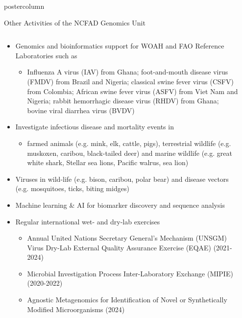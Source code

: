 \documentclass[final]{beamer}
\begin{document}
\begin{frame}
\begin{columns}
\begin{column}{.5\textwidth}
\begin{beamercolorbox}[center,wd=\textwidth]{postercolumn}
\begin{minipage}[T]{.95\textwidth}
{  %
  \begin{block}{Other Activities of the NCFAD Genomics Unit}
    \begin{columns}
      \begin{column}{0.7\textwidth}
        \begin{itemize}
          \item Genomics and bioinformatics support for WOAH and FAO Reference Laboratories such as
          \begin{itemize}
            \item Influenza A virus (IAV) from Ghana; foot-and-mouth disease virus (FMDV) from Brazil and Nigeria; classical swine fever virus (CSFV) from Colombia; African swine fever virus (ASFV) from Viet Nam and Nigeria; rabbit hemorrhagic disease virus (RHDV) from Ghana; bovine viral diarrhea virus (BVDV)
          \end{itemize}
          \item Investigate infectious disease and mortality events in
          \begin{itemize}
            \item farmed animals (e.g. mink, elk, cattle, pigs), terrestrial wildlife (e.g. muskoxen, caribou, black-tailed deer) and marine wildlife (e.g. great white shark, Stellar sea lions, Pacific walrus, sea lion)
          \end{itemize}
          \item Viruses in wild-life (e.g. bison, caribou, polar bear) and disease vectors (e.g. mosquitoes, ticks, biting midges)
          \item Machine learning \& AI for biomarker discovery and sequence analysis
          \item Regular international wet- and dry-lab exercises
          \begin{itemize}
            \item Annual United Nations Secretary General's Mechanism (UNSGM) Virus Dry-Lab External Quality Assurance Exercise (EQAE) (2021-2024)
            \item Microbial Investigation Process Inter-Laboratory Exchange (MIPIE) (2020-2022)
            \item Agnostic Metagenomics for Identification of Novel or Synthetically Modified Microorganisms (2024)
          \end{itemize}
        \end{itemize}
      \end{column}
      \begin{column}{0.3\textwidth}

\end{column}
\end{columns}
\end{block}}
\end{minipage}
\end{beamercolorbox}
\end{column}
\end{columns}
\end{frame}
\end{document}
